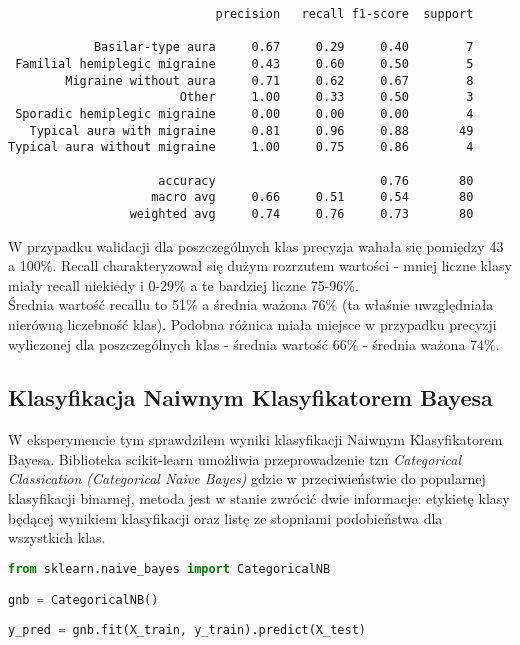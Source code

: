 \begin{verbatim}
                             precision   recall f1-score  support

            Basilar-type aura     0.67     0.29     0.40        7
 Familial hemiplegic migraine     0.43     0.60     0.50        5
        Migraine without aura     0.71     0.62     0.67        8
                        Other     1.00     0.33     0.50        3
 Sporadic hemiplegic migraine     0.00     0.00     0.00        4
   Typical aura with migraine     0.81     0.96     0.88       49
Typical aura without migraine     1.00     0.75     0.86        4

                     accuracy                       0.76       80
                    macro avg     0.66     0.51     0.54       80
                 weighted avg     0.74     0.76     0.73       80
\end{verbatim}

W przypadku walidacji dla poszczególnych klas precyzja wahała się pomiędzy 43 a 100\%. Recall charakteryzował się dużym rozrzutem wartości - mniej liczne klasy miały recall niekiedy i 0-29\% a te bardziej liczne 75-96\%.\\

Średnia wartość recallu to 51\% a średnia ważona 76\% (ta właśnie uwzględniała nierówną liczebność klas). Podobna różnica miała miejsce w przypadku precyzji wyliczonej dla poszczególnych klas - średnia wartość 66\% - średnia ważona 74\%.\\

\subsection{Klasyfikacja Naiwnym Klasyfikatorem Bayesa}
W eksperymencie tym sprawdziłem wyniki klasyfikacji Naiwnym Klasyfikatorem Bayesa. Biblioteka scikit-learn umożliwia przeprowadzenie tzn \textit{Categorical Classication (Categorical Naive Bayes)} gdzie w przeciwieństwie do popularnej klasyfikacji binarnej, metoda jest w stanie zwrócić dwie informacje: etykietę klasy będącej wynikiem klasyfikacji oraz listę ze stopniami podobieństwa dla wszystkich klas.\\

\begin{lstlisting}[language=Python, caption=Definicja i użycie CategoricalNB]
from sklearn.naive_bayes import CategoricalNB

gnb = CategoricalNB()
    
y_pred = gnb.fit(X_train, y_train).predict(X_test)
\end{lstlisting}    

